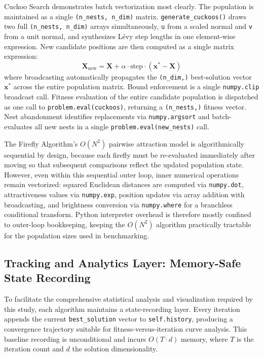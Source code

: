 Cuckoo Search demonstrates batch vectorization most clearly. The population is maintained as a single \texttt{(n\_nests, n\_dim)} matrix. \texttt{generate\_cuckoos()} draws two full \texttt{(n\_nests, n\_dim)} arrays simultaneously, \texttt{u} from a scaled normal and \texttt{v} from a unit normal, and synthesizes Lévy step lengths in one element-wise expression. New candidate positions are then computed as a single matrix expression:
\begin{equation}
    \mathbf{X}_{\text{new}} = \mathbf{X} + \alpha \cdot \text{step} \cdot (\mathbf{x}^* - \mathbf{X})
\end{equation}
where broadcasting automatically propagates the \texttt{(n\_dim,)} best-solution vector \(\mathbf{x}^*\) across the entire population matrix. Bound enforcement is a single \texttt{numpy.clip} broadcast call. Fitness evaluation of the entire candidate population is dispatched as one call to \texttt{problem.eval(cuckoos)}, returning a \texttt{(n\_nests,)} fitness vector. Nest abandonment identifies replacements via \texttt{numpy.argsort} and batch-evaluates all new nests in a single \texttt{problem.eval(new\_nests)} call.

The Firefly Algorithm's $O(N^2)$ pairwise attraction model is algorithmically sequential by design, because each firefly must be re-evaluated immediately after moving so that subsequent comparisons reflect the updated population state. However, even within this sequential outer loop, inner numerical operations remain vectorized: squared Euclidean distances are computed via \texttt{numpy.dot}, attractiveness values via \texttt{numpy.exp}, position updates via array addition with broadcasting, and brightness conversion via \texttt{numpy.where} for a branchless conditional transform. Python interpreter overhead is therefore mostly confined to outer-loop bookkeeping, keeping the $O(N^2)$ algorithm practically tractable for the population sizes used in benchmarking.

\subsection{Tracking and Analytics Layer: Memory-Safe State Recording}
To facilitate the comprehensive statistical analysis and visualization required by this study, each algorithm maintains a state-recording layer. Every iteration appends the current \texttt{best\_solution} vector to \texttt{self.history}, producing a convergence trajectory suitable for fitness-versus-iteration curve analysis. This baseline recording is unconditional and incurs $O(T \cdot d)$ memory, where $T$ is the iteration count and $d$ the solution dimensionality.

